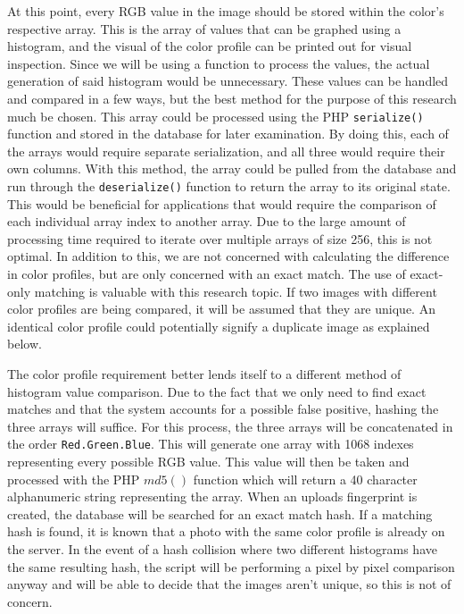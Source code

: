At this point, every RGB value in the image should be stored within the color's respective array. This is the array of values that can be graphed using a histogram, and the visual of the color profile can be printed out for visual inspection. Since we will be using a function to process the values, the actual generation of said histogram would be unnecessary. These values can be handled and compared in a few ways, but the best method for the purpose of this research much be chosen. This array could be processed using the PHP {\tt serialize()} function and stored in the database for later examination. By doing this, each of the arrays would require separate serialization, and all three would require their own columns. With this method, the array could be pulled from the database and run through the {\tt deserialize()} function to return the array to its original state. This would be beneficial for applications that would require the comparison of each individual array index to another array. Due to the large amount of processing time required to iterate over multiple arrays of size 256, this is not optimal. In addition to this, we are not concerned with calculating the difference in color profiles, but are only concerned with an exact match. The use of exact-only matching is valuable with this research topic. If two images with different color profiles are being compared, it will be assumed that they are unique. An identical color profile could potentially signify a duplicate image as explained below.

The color profile requirement better lends itself to a different method of histogram value comparison. Due to the fact that we only need to find exact matches and that the system accounts for a possible false positive, hashing the three arrays will suffice. For this process, the three arrays will be concatenated in the order {\tt Red.Green.Blue}. This will generate one array with 1068 indexes representing every possible RGB value. This value will then be taken and processed with the PHP $md5()$ function which will return a 40 character alphanumeric string representing the array. When an uploads fingerprint is created, the database will be searched for an exact match hash. If a matching hash is found, it is known that a photo with the same color profile is already on the server. In the event of a hash collision where two different histograms have the same resulting hash, the script will be performing a pixel by pixel comparison anyway and will be able to decide that the images aren't unique, so this is not of concern.

